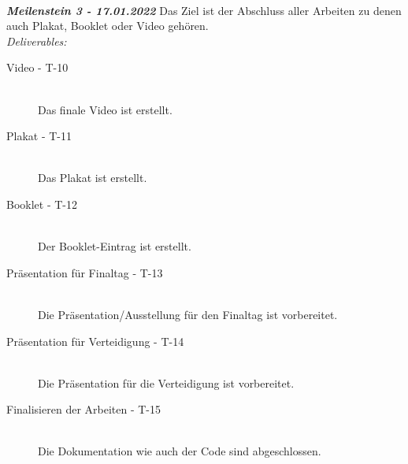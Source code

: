 ~\\

\textit{\textbf{Meilenstein 3 - 17.01.2022}}
Das Ziel ist der Abschluss aller Arbeiten zu denen auch Plakat, Booklet oder Video gehören.\\
\textit{Deliverables:}
\begin{description}
    \item[Video - T-10]\hfill \\
    Das finale Video ist erstellt.
    \item[Plakat - T-11]\hfill \\
    Das Plakat ist erstellt.
    \item[Booklet - T-12]\hfill \\
    Der Booklet-Eintrag ist erstellt.
    \item[Präsentation für Finaltag - T-13]\hfill \\
    Die Präsentation/Ausstellung für den Finaltag ist vorbereitet.
    \item[Präsentation für Verteidigung - T-14]\hfill \\
    Die Präsentation für die Verteidigung ist vorbereitet.
    \item[Finalisieren der Arbeiten - T-15]\hfill \\
    Die Dokumentation wie auch der Code sind abgeschlossen.
\end{description}